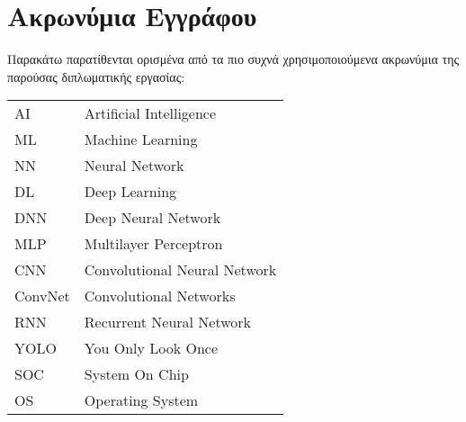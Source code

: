 \chapter*{Ακρωνύμια Εγγράφου}
\label{append:acronyms}
{}

Παρακάτω παρατίθενται ορισμένα από τα πιο συχνά χρησιμοποιούμενα ακρωνύμια της
παρούσας διπλωματικής εργασίας:

\begin{table}[htpb]
  \centering
  \begin{tabular}{l@{$\;\;\longrightarrow\;\;$}l}
    AI & Artificial Intelligence \\
    ML & Machine Learning \\
    NN & Neural Network \\
    DL & Deep Learning \\
    DNN & Deep Neural Network \\
    MLP & Multilayer Perceptron \\
    CNN & Convolutional Neural Network \\
    ConvNet & Convolutional Networks \\
    RNN & Recurrent Neural Network \\
    YOLO & You Only Look Once \\
    SOC & System On Chip \\
    OS & Operating System
  \end{tabular}
\end{table}
